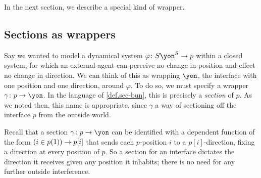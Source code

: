 \documentclass[Book-Poly]{subfiles}
\begin{document}
In the next section, we describe a special kind of wrapper.

\subsection{Sections as wrappers}\label{subsec.poly.dyn_sys.new.sit_encl}

Say we wanted to model a dynamical system $\varphi\colon S\yon^S\to p$ within a closed system, for which an external agent can perceive no change in position and effect no change in direction.
We can think of this as wrapping $\yon$, the interface with one position and one direction, around $\varphi$.
To do so, we must specify a wrapper $\gamma\colon p\to\yon$.
In the language of \cref{def.sec-bun}, this is precisely a \emph{section} of $p$.
As we noted then, this name is appropriate, since $\gamma$ a way of sectioning off the interface $p$ from the outside world.

Recall that a section $\gamma\colon p\to\yon$ can be identified with a dependent function of the form $(i\in p(\textsf{1}))\to p[i]$ that sends each $p$-position $i$ to a $p[i]$-direction, fixing a direction at every position of $p$.
So a section for an interface dictates the direction it receives given any position it inhabits; there is no need for any further outside interference.

\end{document}
